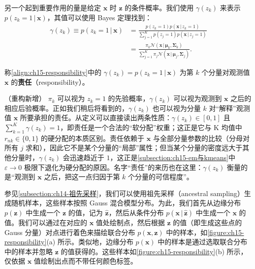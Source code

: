\documentclass[../../main.tex]{subfiles}
\begin{document}
另一个起到重要作用的量是给定 $\bm{x}$ 时 $\bm{z}$ 的条件概率。我们使用 $\gamma(z_k)$ 来表示 $p(z_k=1\,|\,\bm{x})$，其值可以使用 Bayes 定理找到：
\begin{align}
\gamma(z_k)\equiv p(z_k=1\,|\,\bm{x})
&=\frac{p(z_k=1)p(\bm{x}\,|\,z_k=1)}{\sum_{j=1}^{K}p(z_j=1)p(\bm{x}\,|\,z_j=1)}\nonumber\\
&=\frac{\pi_k\mathcal{N}(\bm{x}\,|\,\bm{\mu}_k,\bm{\Sigma}_k)}{\sum_{j=1}^{K}\pi_j\mathcal{N}(\bm{x}\,|\,\bm{\mu}_j,\bm{\Sigma}_j)}.
\label{align:ch15-responsibility}
\end{align}

\begin{definition}[责任]\label{definition:ch15-责任}
称\eqref{align:ch15-responsibility}中的 $\gamma(z_k)=p(z_k=1\,|\,\bm{x})$ 为第 $k$ 个分量对观测值 $\bm{x}$ 的\textbf{责任}（responsibility）。
\end{definition}

\begin{remark}（重构新增）
$\pi_k$ 可以视为 $z_k=1$ 的先验概率，$\gamma(z_k)$ 可以视为观测到 $\bm{x}$ 之后的相应后验概率。正如我们稍后将看到的，$\gamma(z_k)$ 也可以视为分量 $k$ 对“解释”观测值 $\bm{x}$ 所要承担的责任。从定义可以直接读出两条性质：$\gamma(z_k)\in[0,1]$ 且 $\sum_{k=1}^{K}\gamma(z_k)=1$，即责任是一个合法的“软分配”权重；这正是它与 K 均值中 $r_{nk}\in\{0,1\}$ 的硬分配的本质区别。责任依赖于 $\bm{x}$ 与全部分量参数的比较（分母对所有 $j$ 求和），因此它不是某个分量的“局部”属性；但当某个分量的密度远大于其他分量时，$\gamma(z_k)$ 会迅速趋近于 $1$，这正是\cref{subsection:ch15-em与kmeans}中 $\varepsilon\to0$ 极限下退化为硬分配的原因。名字“责任”的来历也在这里：$\gamma(z_k)$ 衡量的是“观测到 $\bm{x}$ 之后，把这一点归因于第 $k$ 个分量的可信程度”。
\end{remark}

参见\cref{subsection:ch14-祖先采样}，我们可以使用祖先采样（ancestral sampling）生成随机样本，这些样本按照 Gauss 混合模型分布。为此，我们首先从边缘分布 $p(\bm{z})$ 中生成一个 $\bm{z}$ 的值，记为 $\hat{\bm{z}}$，然后从条件分布 $p(\bm{x}\,|\,\hat{\bm{z}})$ 中生成一个 $\bm{x}$ 的值。我们可以通过在对应的 $\bm{x}$ 值处绘制点，然后根据 $\bm{z}$ 的值（即生成这些点的 Gauss 分量）对点进行着色来描绘联合分布 $p(\bm{x},\bm{z})$ 中的样本，如\cref{figure:ch15-responsibility}(a) 所示。类似地，边缘分布 $p(\bm{x})$ 中的样本是通过选取联合分布中的样本并忽略 $\bm{z}$ 的值获得的。这些样本如\cref{figure:ch15-responsibility}(b) 所示，仅依据 $\bm{x}$ 值绘制出点而不带任何颜色标签。
\end{document}
